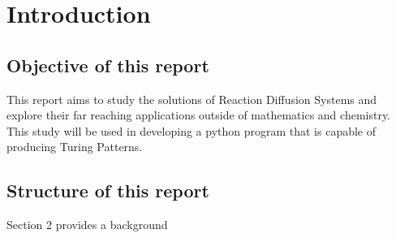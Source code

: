 \section{Introduction}
\label{sec:introduction}

%
%


\subsection{Objective of this report}
This report aims to study the solutions of Reaction Diffusion Systems and explore their far reaching applications outside of mathematics and chemistry. This study will be used in developing a python program that is capable of producing Turing Patterns.


\subsection{Structure of this report}

Section 2 provides a background
